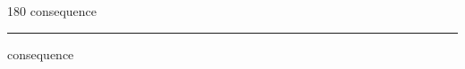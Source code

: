 
\begin{frame}
\begin{center}
\begin{turn}{180}
{\fontsize{2.5cm}{1em}\selectfont consequence}
\end{turn}
\vspace{1em}\par  
\hrule
\vspace{1em}\par  
{\fontsize{2.5cm}{1em}\selectfont consequence}
\end{center}
\end{frame}
